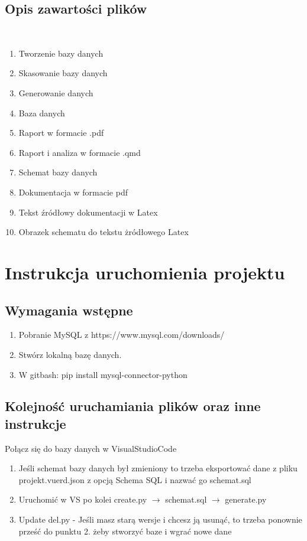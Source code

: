 \documentclass{article}
\begin{document}
\subsection{Opis zawartości plików}\
\begin{enumerate}
    \item Tworzenie bazy danych
    \item Skasowanie bazy danych
    \item Generowanie danych
    \item Baza danych
    \item Raport w formacie .pdf
    \item Raport i analiza w formacie .qmd
    \item Schemat bazy danych 
    \item Dokumentacja w formacie pdf
    \item Tekst źródłowy dokumentacji w Latex
    \item Obrazek schematu do tekstu żródłowego Latex
\end{enumerate}


\section{Instrukcja uruchomienia projektu}
\subsection{Wymagania wstępne}
\begin{enumerate}
    \item Pobranie MySQL z https://www.mysql.com/downloads/
    \item Stwórz lokalną bazę danych.
    \item W gitbash: pip install mysql-connector-python
\end{enumerate}
\subsection{Kolejność uruchamiania plików oraz inne instrukcje}
 Połącz się do bazy danych w VisualStudioCode
\begin{enumerate}
    \item Jeśli schemat bazy danych był zmieniony to trzeba eksportować dane z pliku projekt.vuerd.json z opcją Schema SQL i nazwać go schemat.sql
    \item Uruchomić w VS po kolei create.py $\longrightarrow$ schemat.sql $\longrightarrow$ generate.py
    \item Update del.py - Jeśli masz starą wersje i chcesz ją usunąć, to trzeba ponownie prześć do punktu 2. żeby stworzyć baze i wgrać nowe dane
\end{enumerate}
\end{document}
